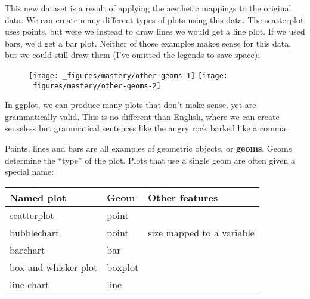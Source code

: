 This new dataset is a result of applying the aesthetic mappings to the
original data. We can create many different types of plots using this
data. The scatterplot uses points, but were we instead to draw lines we
would get a line plot. If we used bars, we'd get a bar plot. Neither of
those examples makes sense for this data, but we could still draw them
(I've omitted the legends to save space):

\begin{Shaded}
\begin{Highlighting}[]
 \OperatorTok{+}
\StringTok{  }\NormalTok{() }\OperatorTok{+}\StringTok{ }
\StringTok{  }\NormalTok{(} \NormalTok{)}
 \OperatorTok{+}
\StringTok{  }\NormalTok{(} \NormalTok{, } \NormalTok{, } \NormalTok{) }\OperatorTok{+}\StringTok{ }
\StringTok{  }\NormalTok{(} \NormalTok{)}
\end{Highlighting}
\end{Shaded}

\begin{figure}[H]
  \texttt{[image: \_figures/mastery/other-geoms-1]}%
  \texttt{[image: \_figures/mastery/other-geoms-2]}
\end{figure}

In ggplot, we can produce many plots that don't make sense, yet are
grammatically valid. This is no different than English, where we can
create senseless but grammatical sentences like the angry rock barked
like a comma.

Points, lines and bars are all examples of geometric objects, or
\textbf{geoms}. Geoms determine the ``type'' of the plot. Plots that use
a single geom are often given a special name:

\begin{longtable}[]{@{}lll@{}}
\toprule
Named plot & Geom & Other features\tabularnewline
\midrule
\endhead
scatterplot & point &\tabularnewline
bubblechart & point & size mapped to a variable\tabularnewline
barchart & bar &\tabularnewline
box-and-whisker plot & boxplot &\tabularnewline
line chart & line &\tabularnewline
\bottomrule
\end{longtable}

